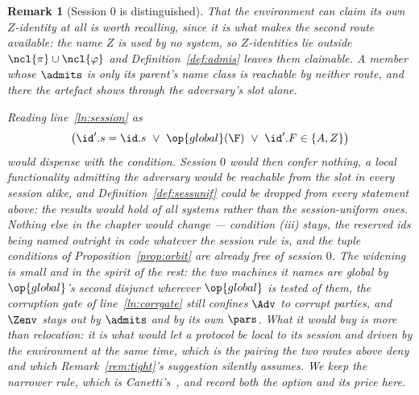 \documentclass[10pt,oneside,openany]{book}
\theoremstyle{accentdef}
\newtheorem{remark}[definition]{Remark}
\theoremstyle{accentplain}
\begin{document}
\begin{remark}[Session $0$ is distinguished]
That the environment can claim its own $Z$-identity at all is worth recalling, since it is what makes
the second route available: the name $Z$ is used by no system, so $Z$-identities lie outside
$\ncl{\pi} \cup \ncl{\varphi}$ and Definition~\ref{def:admis} leaves them claimable. A member whose
$\admits$ is only its parent's name class is reachable by neither route, and there the artefact shows
through the adversary's slot alone.

Reading line~\ref{ln:session} as
\[
  \bigl(\id'.s = \id.s \ \vee\ \op{global}(\F) \ \vee\ \id'.F \in \{A,Z\}\bigr)
\]
would dispense with the condition. Session $0$ would then confer nothing, a local functionality
admitting the adversary would be reachable from the slot in every session alike, and
Definition~\ref{def:sessunif} could be dropped from every statement above: the results would hold of
all systems rather than the session-uniform ones. Nothing else in the chapter would change ---
condition (iii) stays, the reserved ids being named outright in code whatever the session rule is,
and the tuple conditions of Proposition~\ref{prop:orbit} are already free of session $0$. The
widening is
small and in the spirit of the rest: the two machines it names are global by $\op{global}$'s second
disjunct wherever $\op{global}$ is tested of them, the corruption gate of line~\ref{ln:corrgate}
still confines $\Adv$ to corrupt parties, and $\Zenv$ stays out by $\admits$ and by its own $\pars$.
What it would buy is more than relocation: it is what would let a protocol be local to its session and
driven by the environment at the same time, which is the pairing the two routes above deny and which
Remark~\ref{rem:tight}'s suggestion silently assumes. We keep the narrower rule, which is
Canetti's~\cite{Canetti20},
and record both the option and its price here.
\end{remark}
\end{document}
